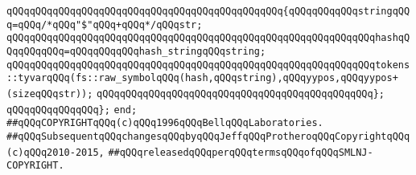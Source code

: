 \verb|qQQqqQQqqQQqqQQqqQQqqQQqqQQqqQQqqQQqqQQqqQQqqQQq{qQQqqQQqqQQqstringqQQq=qQQq/*qQQq"$"qQQq+qQQq*/qQQqstr;|\newline
\verb|qQQqqQQqqQQqqQQqqQQqqQQqqQQqqQQqqQQqqQQqqQQqqQQqqQQqqQQqqQQqqQQqhashqQQqqQQqqQQq=qQQqqQQqqQQqhash_stringqQQqstring;|\newline
\newline
\verb|qQQqqQQqqQQqqQQqqQQqqQQqqQQqqQQqqQQqqQQqqQQqqQQqqQQqqQQqqQQqqQQqtokens::tyvarqQQq(fs::raw_symbolqQQq(hash,qQQqstring),qQQqyypos,qQQqyypos+(sizeqQQqstr));|\newline
\verb|qQQqqQQqqQQqqQQqqQQqqQQqqQQqqQQqqQQqqQQqqQQqqQQq};|\newline
\newline
\verb|qQQqqQQqqQQqqQQq};|\newline
\verb|end;|\newline
\newline
\verb|##qQQqCOPYRIGHTqQQq(c)qQQq1996qQQqBellqQQqLaboratories.|\newline
\verb|##qQQqSubsequentqQQqchangesqQQqbyqQQqJeffqQQqProtheroqQQqCopyrightqQQq(c)qQQq2010-2015,|\newline
\verb|##qQQqreleasedqQQqperqQQqtermsqQQqofqQQqSMLNJ-COPYRIGHT.|\newline

